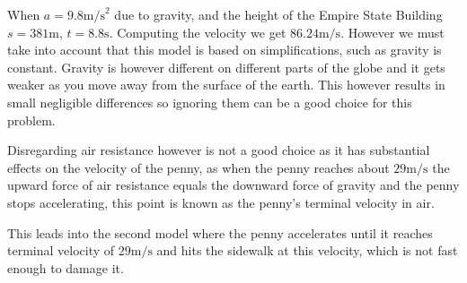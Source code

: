 \documentclass[12pt letter]{report}
\begin{document}
When $a = 9.8 \text{m/s}^2$ due to gravity, and the height of the Empire State Building $s = 381 \text{m}$, $t = 8.8
  \text{s}$. Computing the velocity we get $86.24 \text{m/s}$. However we must take into account that this model is
based on simplifications, such as gravity is constant. Gravity is however different on different parts of the globe
and it gets weaker as you move away from the surface of the earth. This however results in small negligible differences
so ignoring them can be a good choice for this problem.

Disregarding air resistance however is not a good choice as it has substantial effects on the velocity of the penny, as
when the penny reaches about $29 \text{m/s}$ the upward force of air resistance equals the downward force of gravity and
the penny stops accelerating, this point is known as the penny's terminal velocity in air.

This leads into the second model where the penny accelerates until it reaches terminal velocity of $29 \text{m/s}$ and
hits the sidewalk at this velocity, which is not fast enough to damage it.
\end{document}
